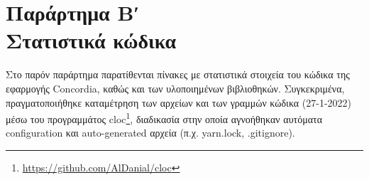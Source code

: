 \chapter*{Παράρτημα Βʹ\\[20pt]Στατιστικά κώδικα}\label{appendix-b}


\captionsetup{labelformat=AppendixBTables}
\setcounter{table}{0}

Στο παρόν παράρτημα παρατίθενται πίνακες με στατιστικά στοιχεία του κώδικα της εφαρμογής Concordia, καθώς και των υλοποιημένων βιβλιοθηκών. Συγκεκριμένα, πραγματοποιήθηκε καταμέτρηση των αρχείων και των γραμμών κώδικα (27-1-2022) μέσω του προγραμμάτος cloc\footnote{\url{https://github.com/AlDanial/cloc}}, διαδικασία στην οποία αγνοήθηκαν αυτόματα configuration και auto-generated αρχεία (π.χ. yarn.lock, .gitignore).

